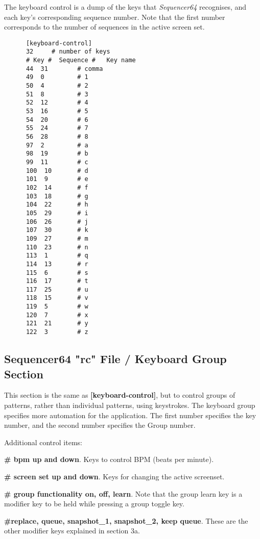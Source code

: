    The keyboard control is a dump of the keys that \textsl{Sequencer64}
   recognises, and each key's corresponding sequence number.
   Note that the first number corresponds to the number of sequences in
   the active screen set.

   \begin{verbatim}
      [keyboard-control]
      32     # number of keys
      # Key #  Sequence #   Key name
      44  31        # comma
      49  0         # 1
      50  4         # 2
      51  8         # 3
      52  12        # 4
      53  16        # 5
      54  20        # 6
      55  24        # 7
      56  28        # 8
      97  2         # a
      98  19        # b
      99  11        # c
      100  10       # d
      101  9        # e
      102  14       # f
      103  18       # g
      104  22       # h
      105  29       # i
      106  26       # j
      107  30       # k
      109  27       # m
      110  23       # n
      113  1        # q
      114  13       # r
      115  6        # s
      116  17       # t
      117  25       # u
      118  15       # v
      119  5        # w
      120  7        # x
      121  21       # y
      122  3        # z
   \end{verbatim}

\subsection{Sequencer64 "rc" File / Keyboard Group Section}
\label{subsec:seq64_rc_file_keyboard_group}

   This section is the same as
   \textbf{[keyboard-control]}, but to control groups of patterns, rather than
   individual patterns, using keystrokes.
   The keyboard group specifies more automation for the application.  The
   first number specifies the key number, and the second number specifies
   the Group number.

   Additional control items:

   \begin{enumber}
      \item \textbf{\# bpm up and down}.
         Keys to control BPM (beats per minute).
      \item \textbf{\# screen set up and down}.
         Keys for changing the active screenset.
      \item \textbf{\# group functionality on, off, learn}.
         Note that the group learn key is a modifier key to be held while 
         pressing a group toggle key.
      \item \textbf{\#replace, queue, snapshot\_1, snapshot\_2, keep queue}.
         These are the other modifier keys explained in section 3a.
   \end{enumber}

